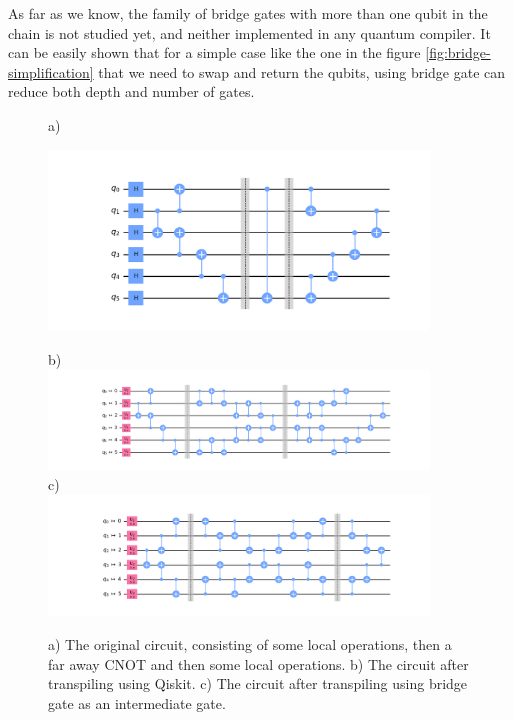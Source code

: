 \documentclass{article}
\begin{document}
  As far as we know, the family of bridge gates with more than one qubit in the chain is not studied yet, and neither implemented in any quantum compiler. 
  It can be easily shown that for a simple case like the one in the figure \ref{fig:bridge-simplification} that we need to swap and return the qubits, using bridge gate can reduce both depth and number of gates. 

  \begin{figure}
    a) \\
    \begin{center}
    \includegraphics[width=0.9\textwidth]{../code/expm_1_bridge/out/original_circuit}
    \end{center}
    b) \\
    \includegraphics[width=0.9\textwidth]{../code/expm_1_bridge/out/transpiled_circuit_swap} \\
    c) \\
    \includegraphics[width=0.9\textwidth]{../code/expm_1_bridge/out/transpiled_circuit_bridge}
    \caption{a) The original circuit, consisting of some local operations, then a far away CNOT and then some local operations. b) The circuit after transpiling using Qiskit. c) The circuit after transpiling using bridge gate as an intermediate gate.}
  \end{figure}
\end{document}
